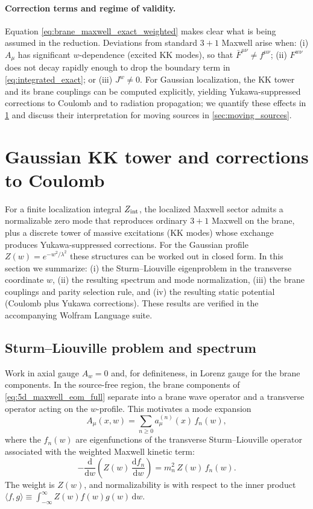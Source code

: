 \documentclass[11pt]{article}
\newcommand{\dd}{\mathrm d}
\newcommand{\A}{A}
\newcommand{\F}{F}
\newcommand{\J}{J}
\newcommand{\Z}{Z}
\newcommand{\lam}{\lambda}      %
\newcommand{\Zint}{Z_{\rm int}} %
\begin{document}
\paragraph{Correction terms and regime of validity.}
Equation \cref{eq:brane_maxwell_exact_weighted} makes clear what is being assumed
in the reduction. Deviations from standard \(3+1\) Maxwell arise when:
(i) \(\A_\mu\) has significant \(w\)-dependence (excited KK modes), so that
\(\bar{\F}^{\mu\nu}\neq f^{\mu\nu}\);
(ii) \(\F^{w\nu}\) does not decay rapidly enough to drop the boundary term in
\cref{eq:integrated_exact}; or (iii) \(\J^w\neq 0\).
For Gaussian localization, the KK tower and its brane couplings can be computed
explicitly, yielding Yukawa-suppressed corrections to Coulomb and to radiation
propagation; we quantify these effects in \cref{sec:kk_coulomb} and discuss their
interpretation for moving sources in \cref{sec:moving_sources}.

\section{Gaussian KK tower and corrections to Coulomb}
\label{sec:kk_coulomb}

For a finite localization integral \(\Zint\), the localized Maxwell sector admits a
normalizable zero mode that reproduces ordinary \(3+1\) Maxwell on the brane, plus
a discrete tower of massive excitations (KK modes) whose exchange produces
Yukawa-suppressed corrections. For the Gaussian profile \(\Z(w)=e^{-w^2/\lam^2}\)
these structures can be worked out in closed form. In this section we summarize:
(i) the Sturm--Liouville eigenproblem in the transverse coordinate \(w\), (ii) the
resulting spectrum and mode normalization, (iii) the brane couplings and parity
selection rule, and (iv) the resulting static potential (Coulomb plus Yukawa
corrections). These results are verified in the accompanying Wolfram Language
suite.

\subsection{Sturm--Liouville problem and spectrum}
\label{sec:kk_spectrum}

Work in axial gauge \(\A_w=0\) and, for definiteness, in Lorenz gauge for the brane
components. In the source-free region, the brane components of
\cref{eq:5d_maxwell_eom_full} separate into a brane wave operator and a transverse
operator acting on the \(w\)-profile. This motivates a mode expansion
\begin{equation}
  \A_\mu(x,w) = \sum_{n\ge 0} a^{(n)}_\mu(x)\,f_n(w),
  \label{eq:kk_expansion}
\end{equation}
where the \(f_n(w)\) are eigenfunctions of the transverse Sturm--Liouville
operator associated with the weighted Maxwell kinetic term:
\begin{equation}
  -\frac{\dd}{\dd w}\!\left(\Z(w)\,\frac{\dd f_n}{\dd w}\right)
  = m_n^2\,\Z(w)\,f_n(w).
  \label{eq:sl_problem}
\end{equation}
The weight is \(\Z(w)\), and normalizability is with respect to the inner product
\(\langle f,g\rangle\equiv \int_{-\infty}^{\infty}\Z(w) f(w)g(w)\,\dd w\).
\end{document}
